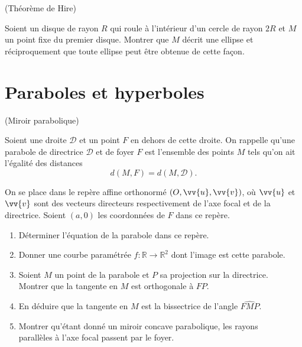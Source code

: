 \documentclass[a4paper,12pt,reqno]{amsart}
\begin{document}
\begin{exo} (Théorème de Hire)


  Soient un disque de rayon $R$ qui roule à l'intérieur d'un cercle de rayon $2R$ et $M$ un point fixe du premier disque. Montrer que $M$ décrit une ellipse et réciproquement que toute ellipse peut être obtenue de cette façon.

\end{exo}


\section{Paraboles et hyperboles}

\begin{exo} (Miroir parabolique)


  Soient une droite $\mathcal{D}$ et un point $F$ en dehors de cette droite. On rappelle qu'une parabole de directrice $\mathcal{D}$ et de foyer $F$ est l'ensemble des points $M$ tels qu'on ait l'égalité des distances
  $$
    d(M,F)= d(M,\mathcal{D}).
  $$


  On se place dans le repère affine orthonormé $(O,\vv{u},\vv{v})$, où $\vv{u}$ et $\vv{v}$ sont des vecteurs directeurs respectivement de l'axe focal et de la directrice. Soient $(a,0)$ les coordonnées de $F$ dans ce repère.

  \begin{enumerate}

    \item Déterminer l'équation de la parabole dans ce repère.

    \item Donner une courbe paramétrée $f:\mathbb{R}\to\mathbb{R}^{2}$ dont l'image est cette parabole.

    \item Soient $M$ un point de la parabole et $P$ sa projection sur la directrice.\\
    Montrer que la tangente en $M$ est orthogonale à $FP$.

    \item En déduire que la tangente en $M$ est la bissectrice de l'angle $\widehat{FMP}$.

    \item Montrer qu'étant donné un miroir concave parabolique, les rayons\\
    parallèles à l'axe focal passent par le foyer.
  \end{enumerate}

\end{exo}
\end{document}
